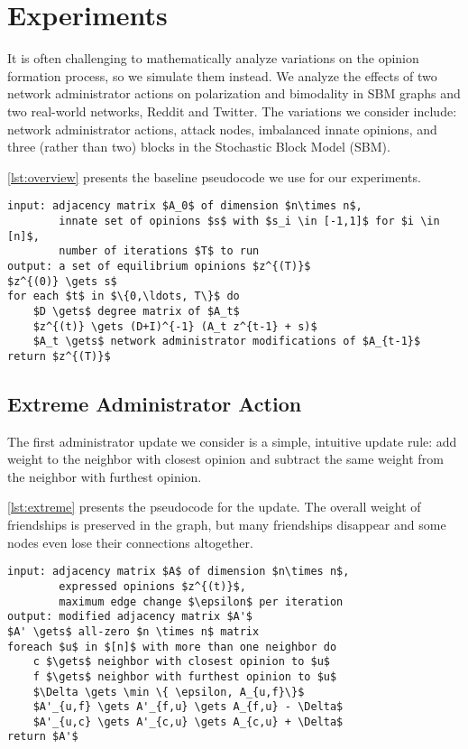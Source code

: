 
\section{Experiments}\label{sec:experiments}

It is often challenging to mathematically analyze
variations on the opinion formation process, so we simulate
them instead. We analyze the effects of two network administrator actions on polarization and bimodality in SBM graphs and two real-world networks, Reddit and Twitter. 
The variations we consider include:
network administrator actions, attack nodes,
imbalanced innate opinions, and three (rather than two)
blocks in the Stochastic Block Model (SBM). 

\cref{lst:overview} presents the baseline
pseudocode we use for our experiments.

\begin{minipage}{\linewidth}
\begin{lstlisting}[caption={Opinion formation.}, label={lst:overview}]
input: adjacency matrix $A_0$ of dimension $n\times n$,
        innate set of opinions $s$ with $s_i \in [-1,1]$ for $i \in [n]$,
        number of iterations $T$ to run
output: a set of equilibrium opinions $z^{(T)}$
$z^{(0)} \gets s$
for each $t$ in $\{0,\ldots, T\}$ do
    $D \gets$ degree matrix of $A_t$
    $z^{(t)} \gets (D+I)^{-1} (A_t z^{t-1} + s)$
    $A_t \gets$ network administrator modifications of $A_{t-1}$
return $z^{(T)}$
\end{lstlisting}
\end{minipage}

\subsection{Extreme Administrator Action}
The first administrator update we consider is
a simple, intuitive update rule: add weight to the neighbor
with closest opinion and subtract the same weight
from the neighbor with furthest opinion.

\cref{lst:extreme} presents the pseudocode for the update.
The overall weight of friendships is preserved in the
graph, but many friendships disappear and some nodes even
lose their connections altogether.

\begin{minipage}{\linewidth}
\begin{lstlisting}[caption={Extreme Administrator Update.}, label={lst:extreme}]
input: adjacency matrix $A$ of dimension $n\times n$,
        expressed opinions $z^{(t)}$,
        maximum edge change $\epsilon$ per iteration
output: modified adjacency matrix $A'$
$A' \gets$ all-zero $n \times n$ matrix
foreach $u$ in $[n]$ with more than one neighbor do
    c $\gets$ neighbor with closest opinion to $u$
    f $\gets$ neighbor with furthest opinion to $u$
    $\Delta \gets \min \{ \epsilon, A_{u,f}\}$
    $A'_{u,f} \gets A'_{f,u} \gets A_{f,u} - \Delta$
    $A'_{u,c} \gets A'_{c,u} \gets A_{c,u} + \Delta$
return $A'$
\end{lstlisting}
\end{minipage}

